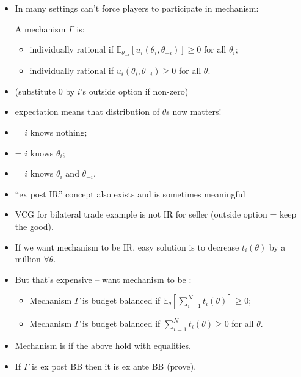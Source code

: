 \documentclass[english]{beamer}		%
\def\lyxframeend{} %
\begin{document}
\begin{itemize}
	\item In many settings can't force players to participate in mechanism:
	\begin{definition}[IR]
		A mechanism $\Gamma$ is:
		\begin{itemize}
			\item {} \alert{individually rational} if
			$\mathbb{E}_{\theta_{-i}} \left[u_i(\theta_i,\theta_{-i})\right] \geq 0$ for all $\theta_i$;
			\item {} \alert{individually rational} if
			$u_i(\theta_i,\theta_{-i}) \geq 0$ for all $\theta$.
		\end{itemize}
		
		 
	\end{definition}
	\item (substitute $0$ by $i$'s outside option if non-zero)
	\item expectation means that distribution of $\theta$s now matters!
\end{itemize}
\lyxframeend


\begin{itemize}
	\item {} = $i$ knows nothing;
	\item {} = $i$ knows $\theta_i$;
	\item {} = $i$ knows $\theta_i$ and $\theta_{-i}$.
	\item ``ex post IR'' concept also exists and is sometimes meaningful
\end{itemize}
\lyxframeend


\begin{itemize}
	\item VCG for bilateral trade example is not IR for seller (outside option = keep the good).
	\pause\medskip
	\item If we want mechanism to be IR, easy solution is to decrease $t_i(\theta)$ by a million $\forall \theta$.
	\item But that's expensive -- want mechanism to be :
	\pause
	\begin{definition}[BB]
		\begin{itemize}
			\item Mechanism $\Gamma$ is  \alert{budget balanced} if $\mathbb{E}_\theta \left[ \sum_{i=1}^N t_i (\theta) \right] \geq 0$;
			\item Mechanism $\Gamma$ is  \alert{budget balanced} if $\sum_{i=1}^N t_i (\theta) \geq 0$ for all $\theta$.
		\end{itemize}
	\end{definition}
	\item Mechanism is  if the above hold with equalities.
	\item If $\Gamma$ is ex post BB then it is ex ante BB (prove).
\end{itemize}
\lyxframeend
\end{document}
